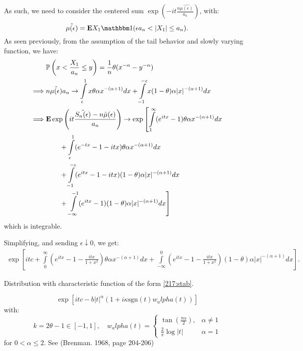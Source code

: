 \documentclass[../main/main.tex]{subfiles}
\begin{document}
As such, we need to consider the centered sum $\exp \left( -it \frac{n \hat{\mu(\epsilon)}}{a_n} \right)$, with: \[
	\hat{\mu(\epsilon)} = \E X_1 \ind (\epsilon a_n < |X_1| \leq a_n).
\] As seen previously, from the assumption of the tail behavior and slowly varying function, we have:
\begin{align*}
	         & \mathbb{P} \left( x < \frac{X_1}{a_n} \leq y \right) = \frac{1}{n}\theta (x^{-\alpha}- y^{-\alpha})                                                                                  \\
	\implies & n \hat{\mu(\epsilon)}a_n \to \int\limits_{\epsilon}^{1} x \theta \alpha x^{-(\alpha+1)}dx + \int\limits_{-1}^{-\epsilon} x(1-\theta)\alpha |x|^{-(\alpha+1)}dx                \\
	\implies & \text{\textbf{E}} \exp \left( it \frac{\hat{S_n(\epsilon)} - n \hat{\mu}(\epsilon)}{a_n} \right) \to \exp \left[ \int\limits_{1}^{\infty}(e^{itx}-1) \theta \alpha x^{-(\alpha+1)}dx \right. \\
	         & \quad \quad + \int\limits_{\epsilon}^{1} (e^{-tx}-1-itx) \theta \alpha x^{-(\alpha+1)}dx                                                                                      \\
	         & \quad \quad + \int\limits_{-1}^{-\epsilon}(e^{itx}-1 -itx) (1-\theta)\alpha |x|^{-(\alpha+1)}dx                                                                               \\
	         & \quad \quad +\left. \int\limits_{-\infty}^{-1}(e^{itx}-1)(1-\theta)\alpha|x|^{-(\alpha+1)}dx\right]
\end{align*}
which is integrable.

Simplifying, and sending $\epsilon \downarrow 0$, we get:
\begin{align}\label{217:stab}
	\exp \left[ itc + \int\limits_{0}^{\infty}(e^{itx}-1 - \frac{itx}{1+x^2}) \theta \alpha x^{-(\alpha+1)}dx + \int\limits_{-\infty}^{0} (e^{itx}-1 - \frac{itx}{1+x^2})(1-\theta) \alpha |x|^{-(\alpha+1)} dx \right].
\end{align}
\begin{definition}
	Distribution with characteristic function of the form \ref{217:stab}.
\end{definition}

\begin{remark} \[
		\exp \left[ itc - b|t|^{\alpha}(1+i \kappa \text{sgn}(t) w_alpha(t)) \right]
	\] with: \[
		k = 2 \theta - 1 \in [-1,1], \quad w_alpha(t) = \begin{cases}
			\tan( \frac{\pi \alpha}{2}), & \alpha \neq 1 \\
			\frac{2}{\pi} \log |t|       & \alpha = 1
		\end{cases} \]
	for $0<\alpha \leq 2$. See (Brenman. 1968, page 204-206)
\end{remark}
\end{document}
